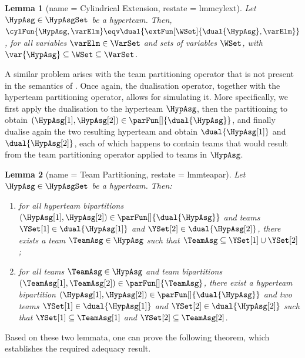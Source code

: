 \documentclass[authoryear]{elsarticle}
\newtheorem{lemma}{Lemma}
\begin{document}
\begin{lemma}[name = Cylindrical Extension, restate = lmmcylext]
  \label{lmm:cylext}
  Let $\HypAsg \in \HypAsgSet$ be a hyperteam.
  Then, $\cylFun{\HypAsg, \varElm} \eqv \dual{\extFun[\WSet]{\dual{\HypAsg},
  \varElm}}$, for all variables $\varElm \in \VarSet$ and sets of variables
  $\WSet$, with $\var{\HypAsg} \subseteq \WSet \subseteq \VarSet$.
\end{lemma}

A similar problem arises with the team partitioning operator that is not present
in the semantics of \ADIF.
Once again, the dualisation operator, together with the hyperteam partitioning
operator, allows for simulating it.
More specifically, we first apply the dualisation to the hyperteam $\HypAsg$,
then the partitioning to obtain $(\HypAsg[1], \HypAsg[2])\in
\parFun[]{\dual{\HypAsg}}$, and finally dualise again the two resulting
hyperteam and obtain $\dual{\HypAsg[1]}$ and $\dual{\HypAsg[2]}$, each of which
happens to contain teams that would result from the team partitioning operator
applied to teams in $\HypAsg$.

\begin{lemma}[name = Team Partitioning, restate = lmmteapar]
  \label{lmm:teapar}
  Let $\HypAsg \in \HypAsgSet$ be a hyperteam.
  Then:
  \begin{enumerate}[1)]
  \item\label{lmm:teapar(hyp)}
    for all hyperteam bipartitions $(\HypAsg[1], \HypAsg[2]) \in
    \parFun[]{\dual{\HypAsg}}$ and teams $\YSet[1] \in \dual{\HypAsg[1]}$ and
    $\YSet[2] \in \dual{\HypAsg[2]}$, there exists a team $\TeamAsg \in
    \HypAsg$ such that $\TeamAsg \subseteq \YSet[1] \cup \YSet[2]$;
  \item\label{lmm:teapar(tea)}
    for all teams $\TeamAsg \in \HypAsg$ and team bipartitions $(\TeamAsg[1],
    \TeamAsg[2]) \in \parFun[]{\TeamAsg}$, there exist a hyperteam bipartition
    $(\HypAsg[1], \HypAsg[2]) \in \parFun[]{\dual{\HypAsg}}$ and two teams
    $\YSet[1] \in \dual{\HypAsg[1]}$ and $\YSet[2] \in \dual{\HypAsg[2]}$ such
    that $\YSet[1] \subseteq \TeamAsg[1]$ and $\YSet[2] \subseteq \TeamAsg[2]$.
  \end{enumerate}
\end{lemma}

Based on these two lemmata, one can prove the following theorem, which
establishes the required adequacy result.
\end{document}
